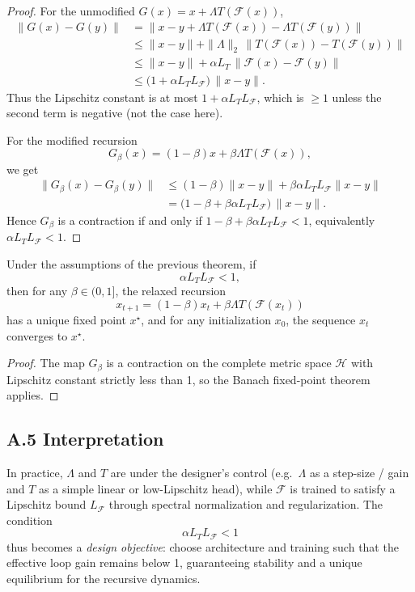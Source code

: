 \documentclass[11pt]{article}
\begin{document}
\begin{proof}
For the unmodified \(G(x) = x + \Lambda T(\mathcal{F}(x))\),
\begin{align*}
  \|G(x) - G(y)\|
  &= \|x-y + \Lambda T(\mathcal{F}(x)) - \Lambda T(\mathcal{F}(y))\| \\
  &\leq \|x-y\|
    + \|\Lambda\|_2 \,\|T(\mathcal{F}(x)) - T(\mathcal{F}(y))\| \\
  &\leq \|x-y\|
    + \alpha L_T \,\|\mathcal{F}(x) - \mathcal{F}(y)\| \\
  &\leq \big(1 + \alpha L_T L_{\mathcal{F}}\big)\,\|x-y\|.
\end{align*}
Thus the Lipschitz constant is at most \(1 + \alpha L_T L_{\mathcal{F}}\), which is \(\geq 1\) unless the second term is negative (not the case here).

For the modified recursion
\[
  G_\beta(x) = (1-\beta)x + \beta \Lambda T(\mathcal{F}(x)),
\]
we get
\begin{align*}
  \|G_\beta(x) - G_\beta(y)\|
  &\leq (1-\beta)\|x-y\|
    + \beta \alpha L_T L_{\mathcal{F}} \|x-y\| \\
  &= \bigl(1-\beta + \beta \alpha L_T L_{\mathcal{F}}\bigr)\,\|x-y\|.
\end{align*}
Hence \(G_\beta\) is a contraction if and only if
\(1-\beta + \beta \alpha L_T L_{\mathcal{F}} < 1\),
equivalently \(\alpha L_T L_{\mathcal{F}} < 1\).
\end{proof}

\begin{corollary}
Under the assumptions of the previous theorem, if
\[
  \alpha L_T L_{\mathcal{F}} < 1,
\]
then for any \(\beta \in (0,1]\), the relaxed recursion
\[
  x_{t+1} = (1-\beta)x_t + \beta \Lambda T(\mathcal{F}(x_t))
\]
has a unique fixed point \(x^\star\), and for any initialization \(x_0\), the sequence \(x_t\) converges to \(x^\star\).
\end{corollary}

\begin{proof}
The map \(G_\beta\) is a contraction on the complete metric space \(\mathcal{H}\) with Lipschitz constant strictly less than 1, so the Banach fixed-point theorem applies.
\end{proof}

\subsection*{A.5 Interpretation}

In practice, \(\Lambda\) and \(T\) are under the designer's control (e.g.\ \(\Lambda\) as a step-size / gain and \(T\) as a simple linear or low-Lipschitz head), while \(\mathcal{F}\) is trained to satisfy a Lipschitz bound \(L_{\mathcal{F}}\) through spectral normalization and regularization.
The condition
\[
  \alpha L_T L_{\mathcal{F}} < 1
\]
thus becomes a \emph{design objective}: choose architecture and training such that the effective loop gain remains below 1, guaranteeing stability and a unique equilibrium for the recursive dynamics.

\nocite{*}


\end{document}
